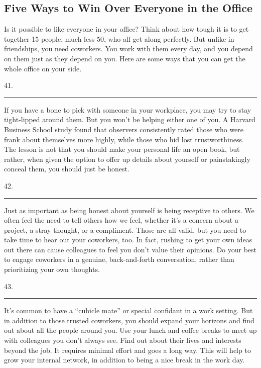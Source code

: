 \documentclass[UTF8,11pt]{ctexart}
\begin{document}
\subsection*{\textbf{Five Ways to Win Over Everyone in the Office}}


Is it possible to like everyone in your office? Think about how tough it is to get together 15 people, much less 50, who all get along perfectly. But unlike in friendships, you need coworkers. You work with them every day, and you depend on them just as they depend on you. Here are some ways that you can get the whole office on your side.


41. \par\noindent\rule{.95\linewidth}{.4pt}\par


If you have a bone to pick with someone in your workplace, you may try to stay tight-lipped around them. But you won’t be helping either one of you. A Harvard Business School study found that observers consistently rated those who were frank about themselves more highly, while those who hid lost trustworthiness. The lesson is not that you should make your personal life an open book, but rather, when given the option to offer up details about yourself or painstakingly conceal them, you should just be honest.


42. \par\noindent\rule{.95\linewidth}{.4pt}\par


Just as important as being honest about yourself is being receptive to others. We often feel the need to tell others how we feel, whether it’s a concern about a project, a stray thought, or a compliment. Those are all valid, but you need to take time to hear out your coworkers, too. In fact, rushing to get your own ideas out there can cause colleagues to feel you don’t value their opinions. Do your best to engage coworkers in a genuine, back-and-forth conversation, rather than prioritizing your own thoughts.


43. \par\noindent\rule{.95\linewidth}{.4pt}\par


It’s common to have a “cubicle mate” or special confidant in a work setting. But in addition to those trusted coworkers, you should expand your horizons and find out about all the people around you. Use your lunch and coffee breaks to meet up with colleagues you don’t always see. Find out about their lives and interests beyond the job. It requires minimal effort and goes a long way. This will help to grow your internal network, in addition to being a nice break in the work day.
\end{document}
